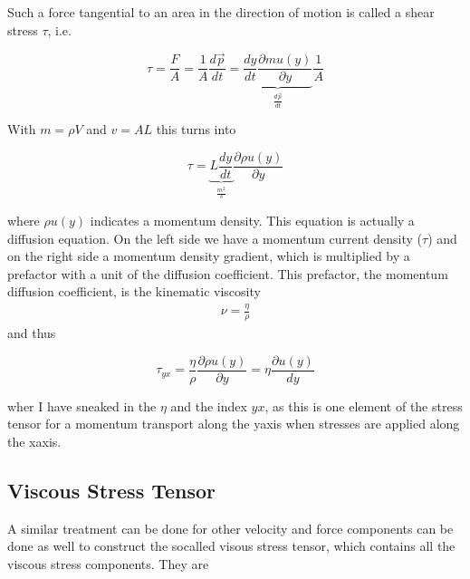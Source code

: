 \documentclass[letterpaper,10pt,english]{sphinxmanual}
\begin{document}
\sphinxAtStartPar
Such a force tangential to an area in the direction of motion is called a shear stress \(\tau\), i.e.

\sphinxAtStartPar
\begin{equation}
\tau=\frac{F}{A}=\frac{1}{A}\frac{d\vec{p}}{dt}=\underbrace{\frac{dy}{dt}\frac{\partial m u(y)}{\partial y}}_{\frac{d\vec{p}}{dt}}\frac{1}{A}
\end{equation}

\sphinxAtStartPar
With \(m=\rho V\) and \(v=A L\) this turns into

\sphinxAtStartPar
\begin{equation}
\tau=\underbrace{L\frac{dy}{dt}}_{\frac{m^2}{s}}\frac{\partial \rho u(y)}{\partial y}
\end{equation}

\sphinxAtStartPar
where \(\rho u(y)\) indicates a momentum density. This equation is actually a diffusion equation. On the left side we have a momentum current density (\(\tau\)) and on the right side a momentum density gradient, which is multiplied by a prefactor with a unit of the diffusion coefficient. This prefactor, the momentum diffusion coefficient, is the kinematic viscosity
\begin{equation*}
\begin{split}\nu=\frac{\eta}{\rho} \tag{kinematic viscosity}\end{split}
\end{equation*}
\sphinxAtStartPar
and thus

\sphinxAtStartPar
\begin{equation}
\tau_{yx}=\frac{\eta}{\rho}\frac{\partial \rho u(y)}{\partial y}=\eta \frac{\partial u(y)}{dy}
\end{equation}

\sphinxAtStartPar
wher I have sneaked in the  \(\eta\) and the index \(yx\), as this is one element of the stress tensor for a momentum transport along the y\sphinxhyphen{}axis when stresses are applied along the x\sphinxhyphen{}axis.


\subsection{Viscous Stress Tensor}
\label{\detokenize{notebooks/L17/1_hydrodynamics:Viscous-Stress-Tensor}}
\sphinxAtStartPar
A similar treatment can be done for other velocity and force components can be done as well to construct the so\sphinxhyphen{}called visous stress tensor, which contains all the viscous stress components. They are
\end{document}

